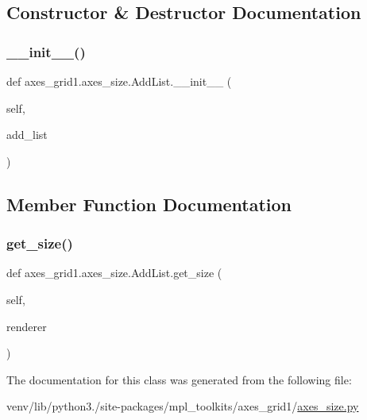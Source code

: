 \subsection{Constructor \& Destructor Documentation}
\mbox{\label{classaxes__grid1_1_1axes__size_1_1AddList_a902b101da315afd1a6384a7e38c46e23}} 
\subsubsection{\texorpdfstring{\+\_\+\+\_\+init\+\_\+\+\_\+()}{\_\_init\_\_()}}
{\footnotesize\ttfamily def axes\+\_\+grid1.\+axes\+\_\+size.\+Add\+List.\+\_\+\+\_\+init\+\_\+\+\_\+ (\begin{DoxyParamCaption}\item[{}]{self,  }\item[{}]{add\+\_\+list }\end{DoxyParamCaption})}



\subsection{Member Function Documentation}
\mbox{\label{classaxes__grid1_1_1axes__size_1_1AddList_a8f1d4e70a4aaa08ca76559390de9a34e}} 
\subsubsection{\texorpdfstring{get\+\_\+size()}{get\_size()}}
{\footnotesize\ttfamily def axes\+\_\+grid1.\+axes\+\_\+size.\+Add\+List.\+get\+\_\+size (\begin{DoxyParamCaption}\item[{}]{self,  }\item[{}]{renderer }\end{DoxyParamCaption})}



The documentation for this class was generated from the following file\+:\begin{DoxyCompactItemize}
\item 
venv/lib/python3./site-\/packages/mpl\+\_\+toolkits/axes\+\_\+grid1/\hyperlink{_2axes__size_8py}{axes\+\_\+size.\+py}\end{DoxyCompactItemize}
